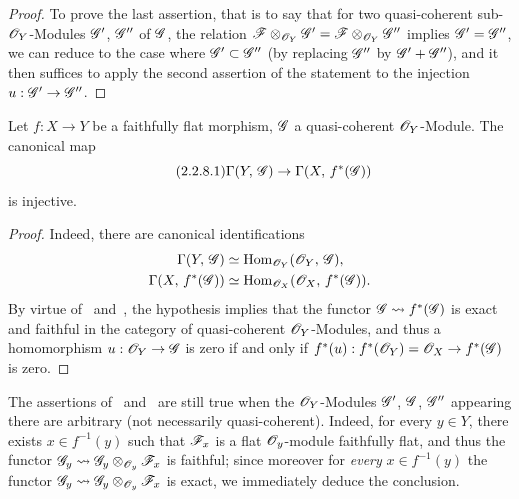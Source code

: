 \begin{proof}
To prove the last assertion, that is to say that for two quasi-coherent sub-$\mathscr{O}_Y$-Modules $\mathscr{G}'$, $\mathscr{G}''$ of $\mathscr{G}$, the relation $\mathscr{F}\otimes_{\mathscr{O}_Y}\mathscr{G}'=\mathscr{F}\otimes_{\mathscr{O}_Y}\mathscr{G}''$ implies $\mathscr{G}'=\mathscr{G}''$, we can reduce to the case where $\mathscr{G}'\subset\mathscr{G}''$ (by replacing $\mathscr{G}''$ by $\mathscr{G}'+\mathscr{G}''$), and it then suffices to apply the second assertion of the statement to the injection $u:\mathscr{G}'\to\mathscr{G}''$.
\end{proof}

\begin{corollary}[2.2.8]
\label{IV.2.2.8}
Let $f:X\to Y$ be a faithfully flat morphism, $\mathscr{G}$ a quasi-coherent $\mathscr{O}_Y$-Module.
The canonical map
\begin{equation}
\tag{2.2.8.1}
\label{IV.2.2.8.1}
  \Gamma(Y,\,\mathscr{G}) \to \Gamma(X,\,f^*(\mathscr{G}))
\end{equation}
is injective.
\end{corollary}

\begin{proof}
Indeed, there are canonical identifications~
\begin{align*}
  \Gamma(Y,\,\mathscr{G})
    &\simeq \operatorname{Hom}_{\mathscr{O}_Y}(\mathscr{O}_Y,\,\mathscr{G}),\\
  \Gamma(X,\,f^*(\mathscr{G}))
    &\simeq \operatorname{Hom}_{\mathscr{O}_X}(\mathscr{O}_X,\,f^*(\mathscr{G})).
\end{align*}
By virtue of~ and~, the hypothesis implies that the functor $\mathscr{G}\leadsto f^*(\mathscr{G})$ is exact and faithful in the category of quasi-coherent $\mathscr{O}_Y$-Modules, and thus a homomorphism $u:\mathscr{O}_Y\to\mathscr{G}$ is zero if and only if $f^*(u):f^*(\mathscr{O}_Y)=\mathscr{O}_X\to f^*(\mathscr{G})$ is zero.
\end{proof}

\begin{remark}[2.2.9]
\label{IV.2.2.9}
The assertions of~ and~ are still true when the $\mathscr{O}_Y$-Modules $\mathscr{G}'$, $\mathscr{G}$, $\mathscr{G}''$ appearing there are arbitrary (not necessarily quasi-coherent).
Indeed, for every $y\in Y$, there exists $x\in f^{-1}(y)$ such that $\mathscr{F}_x$ is a flat $\mathscr{O}_y$-module
faithfully flat, and thus the functor $\mathscr{G}_y\leadsto\mathscr{G}_y\otimes_{\mathscr{O}_y}\mathscr{F}_x$ is faithful; since moreover for \emph{every} $x\in f^{-1}(y)$ the functor $\mathscr{G}_y\leadsto\mathscr{G}_y\otimes_{\mathscr{O}_y}\mathscr{F}_x$ is exact, we immediately deduce the conclusion.
\end{remark}

